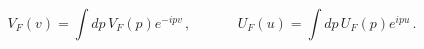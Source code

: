 \begin{equation*}
V_{F}\left( v\right) =\int dp\,V_{F}\left( p\right) e^{-ipv}\,,\ \ \ \ \ \ \
\ \ \ \ \ \ \ \ U_{F}\left( u\right) =\int dp\,U_{F}\left( p\right)
e^{ipu}\,.
\end{equation*}

